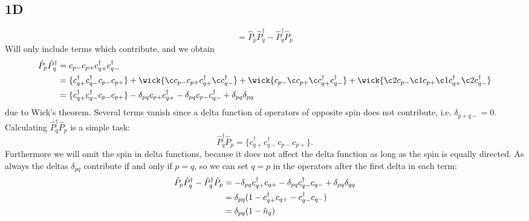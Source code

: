 \documentclass[norsk,a4paper,12pt]{article}
\begin{document}
\subsection*{1D}
\begin{equation}
[\hat{P}_p,\hat{P}_q^{\dagger}]=\hat{P}_p\hat{P}_q^{\dagger}-\hat{P}_q^{\dagger}\hat{P}_p
\end{equation}
Will only include terms which contribute, and we obtain
\begin{align}
\hat{P}_p\hat{P}_q^{\dagger}
&=c_{p-}c_{p+}c_{q+}^{\dagger}c_{q-}^{\dagger}\notag\\
&=\{c_{q+}^{\dagger}c_{q-}^{\dagger}c_{p-}c_{p+}\}+\wick{\c c_{p-}c_{p+}c_{q+}^{\dagger}\c c_{q-}^{\dagger}}+\wick{c_{p-}\c c_{p+}\c c_{q+}^{\dagger}c_{q-}^{\dagger}}+\wick{\c2 c_{p-}\c1 c_{p+}\c1 c_{q+}^{\dagger}\c2 c_{q-}^{\dagger}}\notag\\
&=\{c_{q+}^{\dagger}c_{q-}^{\dagger}c_{p-}c_{p+}\}-\delta_{pq}c_{p+}c_{q+}^{\dagger}-\delta_{pq}c_{p-}c_{q-}^{\dagger}+\delta_{pq}\delta_{pq}
\end{align}
due to Wick's theorem. Several terms vanish since a delta function of operators of opposite spin does not contribute, i.e. $\delta_{p+q-}=0$. Calculating $\hat{P}_q^{\dagger}\hat{P}_p$ is a simple task:
\begin{equation}
\hat{P}_q^{\dagger}\hat{P}_p=\{c_{q+}^{\dagger}c_{q-}^{\dagger}c_{p-}c_{p+}\}.
\end{equation}
Furthermore we will omit the spin in delta functions, because it does not affect the delta function as long as the spin is equally directed. As always the deltas $\delta_{pq}$ contribute if and only if $p=q$, so we can set $q=p$ in the operators after the first delta in each term:
\begin{align}
\hat{P}_p\hat{P}_q^{\dagger}-\hat{P}_q^{\dagger}\hat{P}_p&=-\delta_{pq}c_{q+}^{\dagger}c_{q+}-\delta_{pq}c_{q-}^{\dagger}c_{q-}+\delta_{pq}\delta_{qq}\notag\\
&=\delta_{pq}(1-c_{q+}^{\dagger}c_{q+}-c_{q-}^{\dagger}c_{q-})\notag\\
&=\delta_{pq}(1-\hat{n}_q)\label{eq:ex1d}
\end{align}
\end{document}

